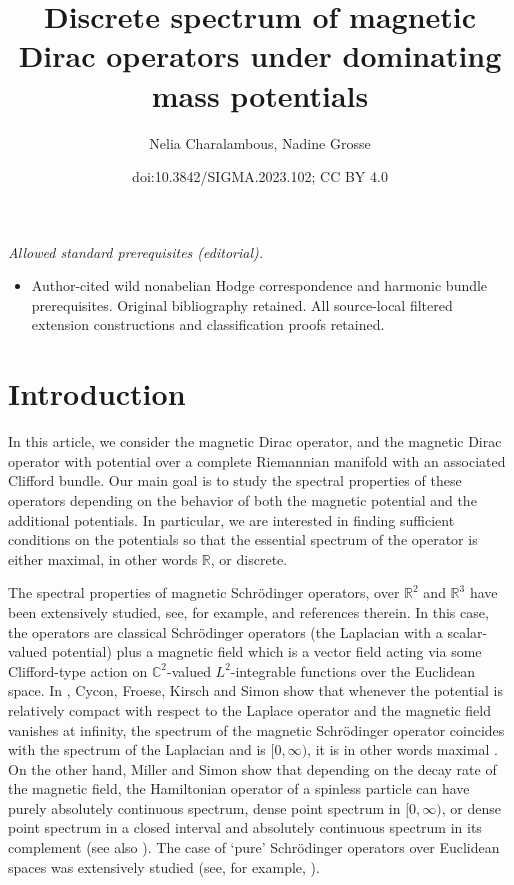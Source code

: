 \documentclass[10pt,a4paper]{amsart}
\title{Discrete spectrum of magnetic Dirac operators under dominating mass potentials}
\author{Nelia Charalambous, Nadine Grosse}
\date{doi:10.3842/SIGMA.2023.102; CC BY 4.0}
\numberwithin{equation}{section}
\begin{document}
\maketitle
\noindent\textit{Allowed standard prerequisites (editorial).}\begin{itemize}
\item Author-cited wild nonabelian Hodge correspondence and harmonic bundle prerequisites. Original bibliography retained. All source-local filtered extension constructions and classification proofs retained.
\end{itemize}\medskip
\section{Introduction}

In this article, we consider the magnetic Dirac operator, and the magnetic Dirac operator with potential over a complete Riemannian manifold with an associated Clifford bundle. Our main goal is to study the spectral properties of these operators depending on the behavior of both the magnetic potential and the additional potentials. In particular, we are interested in finding sufficient conditions on the potentials so that the essential spectrum of the operator is either maximal, in other words ${\mathbb R}$, or discrete.

The spectral properties of magnetic Schr\"odinger operators, over $\mathbb{R}^2$ and $\mathbb{R}^3$ have been extensively studied, see, for example, \cite{CFKS, Helffer, shi} and references therein. In this case, the operators are classical Schr\"odinger operators (the Laplacian with a scalar-valued potential) plus a magnetic field which is a vector field acting via some Clifford-type action on $\mathbb C^2$-valued $L^2$-integrable functions over the Euclidean space. In \cite{CFKS}, Cycon, Froese, Kirsch and Simon show that whenever the potential is relatively compact with respect to the
Laplace operator and the magnetic field vanishes at infinity, the spectrum of the magnetic Schr\"odinger operator coincides with the spectrum of the Laplacian and is $[0,\infty)$, it is in other words maximal \cite[Theorem~6.1]{CFKS}. On the other hand, Miller and Simon show that depending on the decay rate of the magnetic field, the Hamiltonian operator of a spinless particle can have purely absolutely continuous spectrum, dense point spectrum in $[0,\infty)$, or dense point spectrum in a closed interval and absolutely continuous spectrum in its complement \cite{MS} (see also \cite[Theorem~6.2]{CFKS}). The case of `pure' Schr\"odinger operators over Euclidean spaces was extensively studied (see, for example, \cite{Agmon, simon}).
\end{document}
